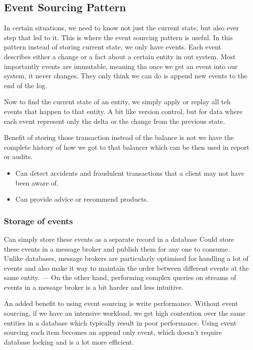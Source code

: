 \subsection{Event Sourcing Pattern}
In certain situations, we need to know not just the current state, but also ever step that led to it.
This is where the event sourcing pattern is useful.
In this pattern instead of storing current state, we only have events.
Each event describes either a change or a fact about a certain entity in out system.
Most importantly events are immutable, meaning tha once we get an event into our system, it never changes.
They only think we can do is append new events to the end of the log.

Now to find the current state of an entity, we simply apply or replay all teh events that happen to that entity.
A bit like version control, but for data where each event represent only the delta or the change from the previous state.

Benefit of storing those transaction instead of the balance is not we have the complete history of how we got to that balancer which can be then used in report or audits.
\begin{itemize}
    \item Can detect accidents and fraudulent transactions that a client may not have been aware of.
    \item Can provide advice or recommend products.
\end{itemize}

\subsubsection{Storage of events}
Can simply store these events as a separate record in a database
Could store these events in a message broker and publish them for any one to consume.
Unlike databases, message brokers are particularly optimised for handling a lot of events and also make it way to maintain the order between different events at the same entity.
--- On the other hand, performing complex queries on streams of events in a message broker is a bit harder and less intuitive.

An added benefit to using event sourcing is write performance.
Without event sourcing, if we have an intensive workload, we get high contention over the same entities in a database which typically result in poor performance.
Using event sourcing each item becomes an append only event, which doesn't require database locking and is a lot more efficient.

